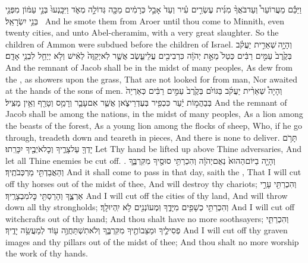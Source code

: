 {וַיַּכֵּ֡ם מֵעֲרוֹעֵר֩ וְעַד\maqqaf בֹּאֲךָ֨ מִנִּ֜ית עֶשְׂרִ֣ים עִ֗יר וְעַד֙ אָבֵ֣ל כְּרָמִ֔ים מַכָּ֖ה גְּדוֹלָ֣ה מְאֹ֑ד וַיִּכָּֽנְעוּ֙ בְּנֵ֣י עַמּ֔וֹן מִפְּנֵ֖י בְּנֵ֥י יִשְׂרָאֵֽל׃ \petucha }
{And he smote them from Aroer until thou come to Minnith, even twenty cities, and unto Abel-cheramim, with a very great slaughter. So the children of Ammon were subdued before the children of Israel.}
\label{haft_40}
\setcounter{chap}{5}
\setcounter{verse}{6}
{וְהָיָ֣ה \legarmeh  שְׁאֵרִ֣ית יַעֲקֹ֗ב בְּקֶ֙רֶב֙ עַמִּ֣ים רַבִּ֔ים כְּטַל֙ מֵאֵ֣ת יְהֹוָ֔ה כִּרְבִיבִ֖ים עֲלֵי\maqqaf עֵ֑שֶׂב אֲשֶׁ֤ר לֹֽא\maqqaf יְקַוֶּה֙ לְאִ֔ישׁ וְלֹ֥א יְיַחֵ֖ל לִבְנֵ֥י אָדָֽם׃ \petucha }
{And the remnant of Jacob shall be in the midst of many peoples, As dew from the \lord, as showers upon the grass, That are not looked for from man, Nor awaited at the hands of the sons of men.}
{וְהָיָה֩ שְׁאֵרִ֨ית יַעֲקֹ֜ב בַּגּוֹיִ֗ם בְּקֶ֙רֶב֙ עַמִּ֣ים רַבִּ֔ים כְּאַרְיֵה֙ בְּבַהֲמ֣וֹת יַ֔עַר כִּכְפִ֖יר בְּעֶדְרֵי\maqqaf צֹ֑אן אֲשֶׁ֧ר אִם\maqqaf עָבַ֛ר וְרָמַ֥ס וְטָרַ֖ף וְאֵ֥ין מַצִּֽיל׃}
{And the remnant of Jacob shall be among the nations, in the midst of many peoples, As a lion among the beasts of the forest, As a young lion among the flocks of sheep, Who, if he go through, treadeth down and teareth in pieces, And there is none to deliver.}
{תָּרֹ֥ם יָדְךָ֖ עַל\maqqaf צָרֶ֑יךָ וְכׇל\maqqaf אֹיְבֶ֖יךָ יִכָּרֵֽתוּ׃}
{Let Thy hand be lifted up above Thine adversaries, And let all Thine enemies be cut off. .}
{וְהָיָ֤ה בַיּוֹם\maqqaf הַהוּא֙ נְאֻם\maqqaf יְהֹוָ֔ה וְהִכְרַתִּ֥י סוּסֶ֖יךָ מִקִּרְבֶּ֑ךָ וְהַאֲבַדְתִּ֖י מַרְכְּבֹתֶֽיךָ׃}
{And it shall come to pass in that day, saith the \lord, That I will cut off thy horses out of the midst of thee, And will destroy thy chariots;}
{וְהִכְרַתִּ֖י עָרֵ֣י אַרְצֶ֑ךָ וְהָרַסְתִּ֖י כׇּל\maqqaf מִבְצָרֶֽיךָ׃}
{And I will cut off the cities of thy land, And will throw down all thy strongholds;}
{וְהִכְרַתִּ֥י כְשָׁפִ֖ים מִיָּדֶ֑ךָ וּֽמְעוֹנְנִ֖ים לֹ֥א יִֽהְיוּ\maqqaf לָֽךְ׃}
{And I will cut off witchcrafts out of thy hand; And thou shalt have no more soothsayers;}
{וְהִכְרַתִּ֧י פְסִילֶ֛יךָ וּמַצֵּבוֹתֶ֖יךָ מִקִּרְבֶּ֑ךָ וְלֹא\maqqaf תִשְׁתַּחֲוֶ֥ה ע֖וֹד לְמַעֲשֵׂ֥ה יָדֶֽיךָ׃}
{And I will cut off thy graven images and thy pillars out of the midst of thee; And thou shalt no more worship the work of thy hands.}
